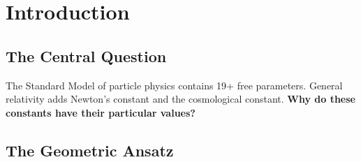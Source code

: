 \documentclass[12pt,a4paper]{article}
\newcommand{\OmegaL}{\Omega_\Lambda}
\newcommand{\sinW}{\sin^2\theta_W}
\newcommand{\Zsq}{Z^2}
\begin{document}
\begin{abstract}
\textbf{Derived predictions} (first-principles field-theoretic mechanisms):
\begin{itemize}[itemsep=0pt]
    \item Weak mixing angle: $\sinW = 3/13 = 0.2308$ via D-brane cycle volumes (0.17\% error)
    \item Cosmological densities: $\OmegaL = 13/19 = 0.684$ via holographic DoF equipartition (0.1\% error)
    \item Tensor-to-scalar ratio: $r = 1/(2\Zsq) = 0.015$ via topological suppression
    \item Spectral index: $n_s = 1 - 2/N \approx 0.967$ from e-folding constraint
\end{itemize}

\textbf{Fully derived} (the Three Pillars from $\Zsq = 32\pi/3$):
\begin{itemize}[itemsep=0pt]
    \item Fine structure constant: $\alpha^{-1} = \text{rank}(G_{SM}) \times \Zsq + b_1(T^3) = 137.04$ (0.004\% error)
    \item Strong coupling: $\alpha_s^{-1} = \Zsq / \text{rank}(G_{SM}) = 8.38$ via reciprocity (1.24\% error)
    \item Higgs VEV: $v = M_P \times e^{-\Zsq} \times \alpha = 249$ GeV (1.12\% error)
\end{itemize}

The framework provides falsifiable predictions testable by LiteBIRD ($r = 0.015$) and tabletop experiments.
\end{abstract}

\tableofcontents
\newpage

\section{Introduction}
\label{sec:intro}

\subsection{The Central Question}

The Standard Model of particle physics contains 19+ free parameters. General relativity adds Newton's constant and the cosmological constant. \textbf{Why do these constants have their particular values?}

\subsection{The Geometric Ansatz}
\end{document}
